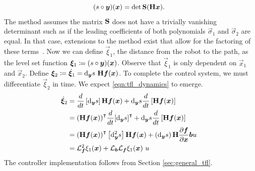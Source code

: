 $$
    (s\circ \bm{y})(\bm{x}) = \det\mathbf{S}(\mathbf{H}\bm{x}).
$$
The method assumes the matrix $\mathbf{S}$ does not have a trivially vanishing determinant such as if the leading coefficients of both polynomials $\vec{\sigma}_1$ and $\vec{\sigma}_2$ are equal. In that case, extensions to the method exist that allow for the factoring of these terms~\cite{Sederberg84}. Now we can define $\vec{\xi}_1$, the distance from the robot to the path, as the level set function $\bm{\xi}_1 \coloneqq (s\circ \bm{y})(\bm{x})$. Observe that $\vec{\xi}_1$ is only dependent on $\vec{x}_1$ and $\vec{x}_2$. Define $\bm{\xi}_2 \coloneqq \dot{\bm{\xi}}_1 = \mathop{}\!\mathrm{d}_{\bm{y}}s~\mathbf{H}\bm{f}(\bm{x})$. To complete the control system, we must differentiate $\vec{\xi}_2$ in time. We expect \eqref{eqn:tfl_dynamics} to emerge.
\begin{align*}
    \dot{\bm{\xi}}_2   &=  \frac{d}{dt}\left[\mathop{}\!\mathrm{d}_{\bm{y}}s\right]\mathbf{H}\bm{f}(\bm{x})
                            +
                            \mathop{}\!\mathrm{d}_{\bm{y}}s\frac{d}{dt}\left[\mathbf{H}\bm{f}(\bm{x})\right]\\
                        &=  {\left(\mathbf{H}\bm{f}(\bm{x})\right)}^{\intercal}\frac{d}{dt}{\left[\mathop{}\!\mathrm{d}_{\bm{y}}s\right]}^{\intercal}
                            +
                            \mathop{}\!\mathrm{d}_{\bm{y}}s\frac{d}{dt}\left[\mathbf{H}\bm{f}(\bm{x})\right]\\
                        &=  {\left(\mathbf{H}\bm{f}(\bm{x})\right)}^{\intercal}\left[\mathop{}\!\mathrm{d}_{\bm{y}}^2 s\right]\mathbf{H}\bm{f}(\bm{x})
                            +
                            \left(\mathop{}\!\mathrm{d}_{\bm{y}} s\right)\mathbf{H}\frac{\partial\bm{f}}{\partial\bm{x}}\bm{b}u\\
                        &= \mathcal{L}_{\bm{f}}^2 \xi_1(\bm{x}) + \mathcal{L}_{\bm{b}}\mathcal{L}_{\bm{f}}\xi_1(\bm{x})~u
\end{align*}
The controller implementation follows from Section \ref{sec:general_tfl}.

